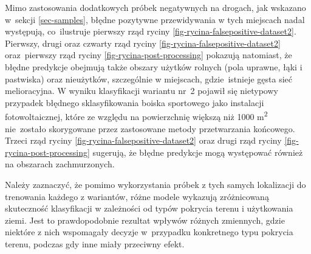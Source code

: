 \documentclass{amuthesis}
\begin{document}
Mimo zastosowania dodatkowych próbek negatywnych na drogach, jak
wskazano w~sekcji \ref{sec-samples}, błędne pozytywne przewidywania w
tych miejscach nadal występują, co~ilustruje pierwszy rząd ryciny
\ref{fig-rycina-falsepositive-dataset2}. Pierwszy, drugi oraz czwarty
rząd ryciny \ref{fig-rycina-falsepositive-dataset2} oraz~pierwszy rząd
ryciny \ref{fig-rycina-post-processing} pokazują natomiast, że błędne
predykcje obejmują także obszary użytków rolnych (pola uprawne, łąki i
pastwiska) oraz nieużytków, szczególnie w miejscach, gdzie~istnieje
gęsta sieć melioracyjna. W wyniku klasyfikacji wariantu nr~2 pojawił się
nietypowy przypadek błędnego sklasyfikowania boiska sportowego jako
instalacji fotowoltaicznej, które ze względu na powierzchnię większą niż
1000 m\textsuperscript{2} nie~zostało skorygowane przez zastosowane
metody przetwarzania końcowego. Trzeci rząd ryciny
\ref{fig-rycina-falsepositive-dataset2} oraz drugi rząd ryciny
\ref{fig-rycina-post-processing} sugerują, że błędne predykcje mogą
występować również na obszarach zachmurzonych.

Należy zaznaczyć, że pomimo wykorzystania próbek z tych samych
lokalizacji do trenowania każdego z wariantów, różne modele wykazują
zróżnicowaną skuteczność klasyfikacji w zależności od typów pokrycia
terenu i użytkowania ziemi. Jest to prawdopodobnie rezultat wpływów
różnych zmiennych, gdzie niektóre z nich wspomagały decyzje w~przypadku
konkretnego typu pokrycia terenu, podczas gdy inne miały przeciwny
efekt.
\end{document}
